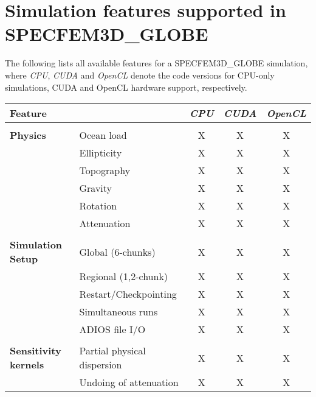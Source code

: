 \chapter*{Simulation features supported in SPECFEM3D\_GLOBE}

The following lists all available features for a SPECFEM3D\_GLOBE simulation,
where {\it CPU}, {\it CUDA} and {\it OpenCL} denote the code versions for CPU-only simulations,
CUDA and OpenCL hardware support, respectively.
%
\begin{table}[htp]
\label{table:features}
\begin{center}
\begin{tabular}{ l l c c c}
\hline
{\bf Feature}   &   & {\it CPU} & {\it CUDA}  & {\it OpenCL} \\
\hline
& & & & \\
{\bf Physics}       & Ocean load      & X   & X   & X \\
                & Ellipticity               & X   & X       & X \\
                & Topography        & X       & X       & X \\
                & Gravity               & X       & X       & X \\
                & Rotation              & X       & X       & X \\
                & Attenuation       & X       & X       & X \\
\hline
& & & & \\
{\bf Simulation Setup}  & Global (6-chunks)     & X & X & X \\
                  & Regional (1,2-chunk)    & X & X & X \\
                  & Restart/Checkpointing & X & X & X \\
                  & Simultaneous runs     & X & X & X \\
                  & ADIOS file I/O        & X & X & X \\
\hline
& & & & \\
{\bf Sensitivity kernels} & Partial physical dispersion     & X     & X     & X \\
                  & Undoing of attenuation          & X     & X     & X \\

\end{tabular}
\end{center}
\end{table}
